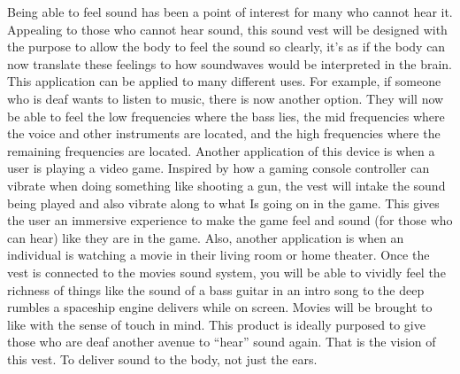 Being able to feel sound has been a point of interest for many who cannot hear it. Appealing to those who cannot hear sound, this sound vest will be designed with the purpose to allow the body to feel the sound so clearly, it’s as if the body can now translate these feelings to how soundwaves would be interpreted in the brain. This application can be applied to many different uses. For example, if someone who is deaf wants to listen to music, there is now another option. They will now be able to feel the low frequencies where the bass lies, the mid frequencies where the voice and other instruments are located, and the high frequencies where the remaining frequencies are  located. Another application of this device is when a user is playing a video game. Inspired by how a gaming console controller can vibrate when doing something like shooting a gun, the vest will intake the sound being played and also vibrate along to what Is going on in the game. This gives the user an immersive experience to make the game feel and sound (for those who can hear) like they are in the game. Also, another application is when an individual is watching a movie in their living room or home theater. Once the vest is connected to the movies sound system, you will be able to vividly feel the richness of things like the sound of a bass guitar in an intro song to the deep rumbles a spaceship engine delivers while on screen. Movies will be brought to like with the sense of touch in mind. This product is ideally purposed to give those who are deaf another avenue to “hear” sound again. That is the vision of this vest. To deliver sound to the body, not just the ears.  
